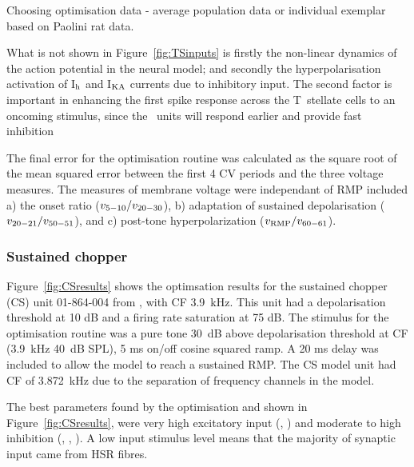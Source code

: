 Choosing optimisation data - average population data or individual exemplar based on Paolini rat data.


What is not shown in Figure~\ref{fig:TSinputs} is firstly the non-linear
dynamics of the action potential in the neural model; and secondly the
hyperpolarisation activation of I$_{\rm h}$ and I$_{\rm KA}$ currents due to inhibitory
input.  The second factor is important in enhancing the first spike response
across the T~stellate cells \citep{PaoliniClareyEtAl:2004}to an oncoming
stimulus, since the \OnC~units will respond earlier and provide fast inhibition 


The final error for the optimisation routine was calculated as the square root
of the mean squared error between the first 4 CV periods and the three voltage
measures. The measures of membrane voltage were independant of RMP included a)
the onset ratio ($v_{\rm 5-10}/v_{\rm 20-30}$), b) adaptation of sustained
depolarisation ($v_{\rm 20-21}/v_{\rm 50-51}$), and c) post-tone
hyperpolarization ($v_{\rm RMP}/v_{\rm 60-61}$).


\subsubsection{Sustained chopper}

Figure~\ref{fig:CSresults} shows the optimsation results for the sustained
chopper (CS) unit 01-864-004 from \citep{PaoliniClareyEtAl:2005}, with CF
3.9~kHz. This unit had a depolarisation threshold at 10 dB and a firing rate
saturation at 75 dB. The stimulus for the optimisation routine was a pure tone
30~dB above depolarisation threshold at CF (3.9~kHz 40~dB SPL), 5 ms on/off
cosine squared ramp.  A 20 ms delay was included to allow the model to reach a
sustained RMP. The CS model unit had CF of 3.872~kHz due to the separation of
frequency channels in the model.

The best parameters found by the optimisation and shown in
Figure~\ref{fig:CSresults}, were very high excitatory input (,
) and moderate to high inhibition (, , ).  A low input stimulus level means that the
majority of synaptic input came from HSR fibres.

